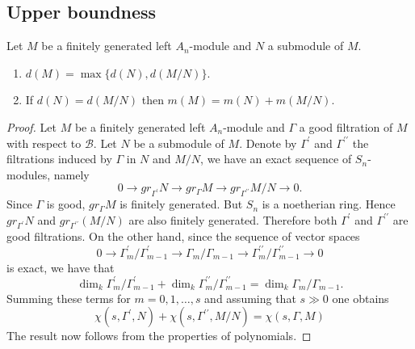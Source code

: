 \documentclass[12pt, oneside]{book}
\begin{document}
\subsection{Upper boundness}
\begin{theorem}
    Let $M$ be a finitely generated left $A_n$-module and $N$ a submodule of $M$.
    \begin{enumerate}
        \item
              $d(M)=\max \{d(N), d(M / N)\}$.
        \item  If $d(N)=d(M / N)$ then $m(M)=m(N)+m(M / N)$.
    \end{enumerate}
    \begin{proof}
        Let $M$ be a finitely generated left $A_n$-module and $\Gamma$ a good filtration of $M$ with respect to $\mathcal{B}$. Let $N$ be a submodule of $M$. Denote by $\Gamma^{\prime}$ and $\Gamma^{\prime \prime}$ the filtrations induced by $\Gamma$ in $N$ and $M / N$, we have an exact sequence of $S_n$-modules, namely
        \begin{equation*}
            0 \rightarrow g r_{\Gamma^{\prime}} N \rightarrow g r_{\Gamma} M \rightarrow g r_{\Gamma^{\prime \prime}} M / N \rightarrow 0 .
        \end{equation*}
        Since $\Gamma$ is good, $g r_{\Gamma} M$ is finitely generated. But $S_n$ is a noetherian ring. Hence $g r_{\Gamma^{\prime}} N$ and $g r_{\Gamma^{\prime \prime}}(M / N)$ are also finitely generated. Therefore both $\Gamma^{\prime}$ and $\Gamma^{\prime \prime}$ are good filtrations.
        On the other hand, since the sequence of vector spaces
        \begin{equation*}
            0 \rightarrow \Gamma_m^{\prime} / \Gamma_{m-1}^{\prime} \rightarrow \Gamma_m / \Gamma_{m-1} \rightarrow \Gamma_m^{\prime \prime} / \Gamma_{m-1}^{\prime \prime} \rightarrow 0
        \end{equation*}
        is exact, we have that
        \begin{equation*}
            \operatorname{dim}_k \Gamma_m^{\prime} / \Gamma_{m-1}^{\prime}+\operatorname{dim}_k \Gamma_m^{\prime \prime} / \Gamma_{m-1}^{\prime \prime}=\operatorname{dim}_k \Gamma_m / \Gamma_{m-1} .
        \end{equation*}
        Summing these terms for $m=0,1, \ldots, s$ and assuming that $s \gg 0$ one obtains
        \begin{equation*}
            \chi\left(s, \Gamma^{\prime}, N\right)+\chi\left(s, \Gamma^{\prime \prime}, M / N\right)=\chi(s, \Gamma, M)
        \end{equation*}
        The result now follows from the properties of polynomials.
    \end{proof}
\end{theorem}
\end{document}

